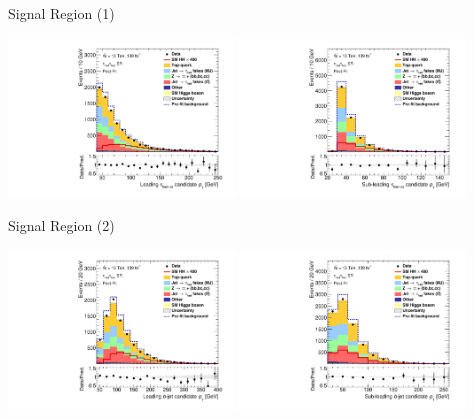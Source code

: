 \documentclass[11pt, xcolor={dvipsnames}, aspectratio=169, notes]{beamer}
\begin{document}
\begin{frame}{Signal Region (1)}
  \centering

  \includegraphics[width=0.45\textwidth]{sr_postfit/Region_BMin0_incJet1_distTau0Pt_J2_Y2015_DLLOS_T2_SpcTauHH_L0_GlobalFit_conditionnal_mu0}%
  \hfill%
  \includegraphics[width=0.45\textwidth]{sr_postfit/Region_BMin0_incJet1_distTau1Pt_J2_Y2015_DLLOS_T2_SpcTauHH_L0_GlobalFit_conditionnal_mu0}
\end{frame}


\begin{frame}{Signal Region (2)}
  \centering

  \includegraphics[width=0.45\textwidth]{sr_postfit/Region_BMin0_incJet1_distpTB0_J2_Y2015_DLLOS_T2_SpcTauHH_L0_GlobalFit_conditionnal_mu0}%
  \hfill%
  \includegraphics[width=0.45\textwidth]{sr_postfit/Region_BMin0_incJet1_distpTB1_J2_Y2015_DLLOS_T2_SpcTauHH_L0_GlobalFit_conditionnal_mu0}
\end{frame}
\end{document}
